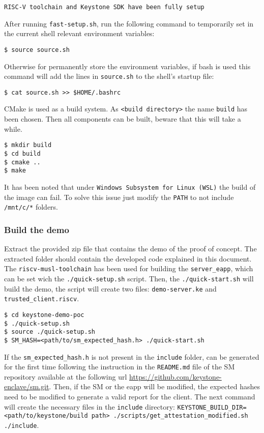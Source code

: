 \begin{lstlisting}[frame=single]
    RISC-V toolchain and Keystone SDK have been fully setup
\end{lstlisting}
After running \texttt{fast-setup.sh}, run the following command to temporarily set in the current shell relevant environment variables: 
\begin{lstlisting}[frame=single]
$ source source.sh
\end{lstlisting}
Otherwise for permanently store the environment variables, if bash is used this command will add the lines in \texttt{source.sh} to the shell's startup file: 
\begin{lstlisting}[frame=single]
$ cat source.sh >> $HOME/.bashrc
\end{lstlisting}
CMake \cite{cmake} is used as a build system. As \texttt{<build directory>} the name \texttt{build} has been chosen. Then all components can be built, beware that this will take a while. 
\begin{lstlisting}[frame=single]
$ mkdir build
$ cd build
$ cmake ..
$ make
\end{lstlisting}
\begin{mybox}
\faExclamation\enspace It has been noted that under \texttt{Windows Subsystem for Linux (WSL)} the build of the image can fail. To solve this issue just modify the \texttt{PATH} to not include \texttt{/mnt/c/*} folders.
\end{mybox}

\subsubsection{Build the demo}
Extract the provided zip file that contains the demo of the proof of concept. The extracted folder should contain the developed code explained in this document. The \texttt{riscv-musl-toolchain} has been used for building the \texttt{server\_eapp}, which can be set wich the \texttt{./quick-setup.sh} script. Then, the \texttt{./quick-start.sh} will build the demo, the script will create two files: \texttt{demo-server.ke} and \texttt{trusted\_client.riscv}. 
\begin{lstlisting}[frame=single]
$ cd keystone-demo-poc
$ ./quick-setup.sh  
$ source ./quick-setup.sh
$ SM_HASH=<path/to/sm_expected_hash.h> ./quick-start.sh
\end{lstlisting}

\begin{mybox}
  If the \texttt{sm\_expected\_hash.h} is not present in the \texttt{include} folder, can be generated for the first time following the instruction in the \texttt{README.md} file of the SM repository available at the following url \url{https://github.com/keystone-enclave/sm.git}. Then, if the SM or the eapp will be modified, the expected hashes need to be modified to generate a valid report for the client. The next command will create the necessary files in the \texttt{include} directory: \texttt{KEYSTONE\_BUILD\_DIR=<path/to/keystone/build\ path> ./scripts/get\_attestation\_modified.sh ./include}.
\end{mybox}


